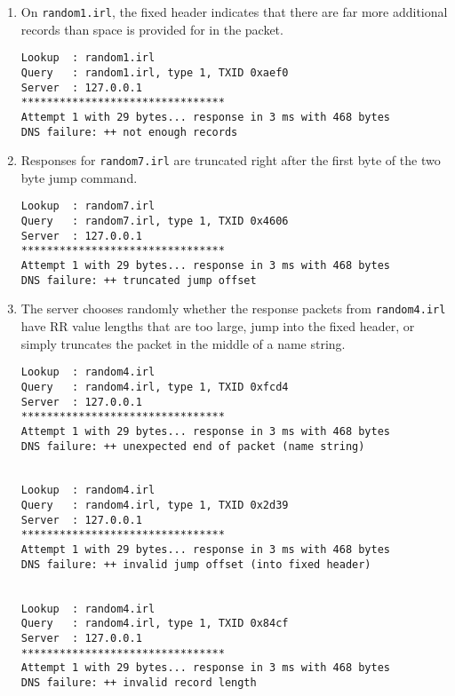\documentclass[11pt]{article}
\begin{document}
\begin{enumerate}
\item {
On \texttt{random1.irl}, the fixed header indicates that there are far more additional records than space is provided for in the packet.

\begin{lstlisting}[label=random1-trace,caption=Trace for \textit{random1.irl}]
Lookup  : random1.irl
Query   : random1.irl, type 1, TXID 0xaef0
Server  : 127.0.0.1
********************************
Attempt 1 with 29 bytes... response in 3 ms with 468 bytes
DNS failure: ++ not enough records
\end{lstlisting}
}

\item {
Responses for \texttt{random7.irl} are truncated right after the first byte of the two byte jump command. 

\begin{lstlisting}[label=random7-trace,caption=Trace for \textit{random7.irl}]
Lookup  : random7.irl
Query   : random7.irl, type 1, TXID 0x4606
Server  : 127.0.0.1
********************************
Attempt 1 with 29 bytes... response in 3 ms with 468 bytes
DNS failure: ++ truncated jump offset
\end{lstlisting}
}

\item {
The server chooses randomly whether the response packets from \texttt{random4.irl} have RR value lengths that are too large, jump into the fixed header, or simply truncates the packet in the middle of a name string.

\begin{lstlisting}[label=random4-trace,caption=Traces for \textit{random4.irl}]
Lookup  : random4.irl
Query   : random4.irl, type 1, TXID 0xfcd4
Server  : 127.0.0.1
********************************
Attempt 1 with 29 bytes... response in 3 ms with 468 bytes
DNS failure: ++ unexpected end of packet (name string)


Lookup  : random4.irl
Query   : random4.irl, type 1, TXID 0x2d39
Server  : 127.0.0.1
********************************
Attempt 1 with 29 bytes... response in 3 ms with 468 bytes
DNS failure: ++ invalid jump offset (into fixed header)


Lookup  : random4.irl
Query   : random4.irl, type 1, TXID 0x84cf
Server  : 127.0.0.1
********************************
Attempt 1 with 29 bytes... response in 3 ms with 468 bytes
DNS failure: ++ invalid record length
\end{lstlisting}
}


\end{enumerate}
\end{document}
